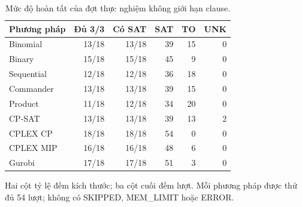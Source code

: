 \begin{table}[pos=H]
\centering
\small
\caption{Mức độ hoàn tất của đợt thực nghiệm không giới hạn clause.}
\label{tab:coverage}
\setlength{\tabcolsep}{4pt}
\begin{tabular}{@{}lrrrrr@{}}
\toprule
Phương pháp & Đủ 3/3 & Có SAT & SAT & TO & UNK \\
\midrule
Binomial & 13/18 & 13/18 & 39 & 15 & 0 \\
Binary & 15/18 & 15/18 & 45 & 9 & 0 \\
Sequential & 12/18 & 12/18 & 36 & 18 & 0 \\
Commander & 13/18 & 13/18 & 39 & 15 & 0 \\
Product & 11/18 & 12/18 & 34 & 20 & 0 \\
CP-SAT & 13/18 & 13/18 & 39 & 13 & 2 \\
CPLEX CP & 18/18 & 18/18 & 54 & 0 & 0 \\
CPLEX MIP & 16/18 & 16/18 & 48 & 6 & 0 \\
Gurobi & 17/18 & 17/18 & 51 & 3 & 0 \\
\bottomrule
\end{tabular}
\par\smallskip\begin{minipage}{\linewidth}\footnotesize Hai cột tỷ lệ đếm kích thước; ba cột cuối đếm lượt. Mỗi phương pháp được thử đủ 54 lượt; không có SKIPPED, MEM\_LIMIT hoặc ERROR.\end{minipage}
\end{table}

